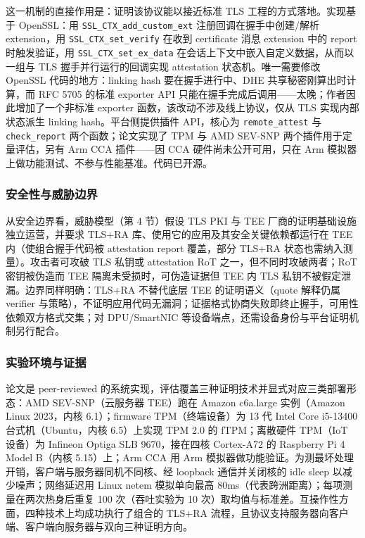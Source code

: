 \documentclass[11pt]{ctexart}
\begin{document}
这一机制的直接作用是：证明该协议能以接近标准 TLS 工程的方式落地。实现基于 OpenSSL：用 \texttt{SSL\_CTX\_add\_custom\_ext} 注册回调在握手中创建/解析 extension，用 \texttt{SSL\_CTX\_set\_verify} 在收到 certificate 消息 extension 中的 report 时触发验证，用 \texttt{SSL\_CTX\_set\_ex\_data} 在会话上下文中嵌入自定义数据，从而以一组与 TLS 握手并行运行的回调实现 attestation 状态机。唯一需要修改 OpenSSL 代码的地方：linking hash 要在握手进行中、DHE 共享秘密刚算出时计算，而 RFC 5705 的标准 exporter API 只能在握手完成后调用——太晚；作者因此增加了一个非标准 exporter 函数，该改动不涉及线上协议，仅从 TLS 实现内部状态派生 linking hash。平台侧提供插件 API，核心为 \texttt{remote\_attest} 与 \texttt{check\_report} 两个函数；论文实现了 TPM 与 AMD SEV-SNP 两个插件用于定量评估，另有 Arm CCA 插件——因 CCA 硬件尚未公开可用，只在 Arm 模拟器上做功能测试、不参与性能基准。代码已开源。\par
\subsubsection{安全性与威胁边界}
从安全边界看，威胁模型（第 4 节）假设 TLS PKI 与 TEE 厂商的证明基础设施独立运营，并要求 TLS+RA 库、使用它的应用及其安全关键依赖都运行在 TEE 内（使组合握手代码被 attestation report 覆盖，部分 TLS+RA 状态也需纳入测量）。攻击者可攻破 TLS 私钥或 attestation RoT 之一，但不同时攻破两者；RoT 密钥被伪造而 TEE 隔离未受损时，可伪造证据但 TEE 内 TLS 私钥不被假定泄漏。边界同样明确：TLS+RA 不替代底层 TEE 的证明语义（quote 解释仍属 verifier 与策略），不证明应用代码无漏洞；证据格式协商失败即终止握手，可用性依赖双方格式交集；对 DPU/SmartNIC 等设备端点，还需设备身份与平台证明机制另行配合。\par
\subsubsection{实验环境与证据}
论文是 peer-reviewed 的系统实现，评估覆盖三种证明技术并显式对应三类部署形态：AMD SEV-SNP（云服务器 TEE）跑在 Amazon c6a.large 实例（Amazon Linux 2023，内核 6.1）；firmware TPM（终端设备）为 13 代 Intel Core i5-13400 台式机（Ubuntu，内核 6.5）上实现 TPM 2.0 的 fTPM；离散硬件 TPM（IoT 设备）为 Infineon Optiga SLB 9670，接在四核 Cortex-A72 的 Raspberry Pi 4 Model B（内核 5.15）上；Arm CCA 用 Arm 模拟器做功能验证。为测最坏处理开销，客户端与服务器同机不同核、经 loopback 通信并关闭核的 idle sleep 以减少噪声；网络延迟用 Linux netem 模拟单向最高 80ms（代表跨洲距离）；每项测量在两次热身后重复 100 次（吞吐实验为 10 次）取均值与标准差。互操作性方面，四种技术上均成功执行了组合的 TLS+RA 流程，且协议支持服务器向客户端、客户端向服务器与双向三种证明方向。\par
\end{document}
